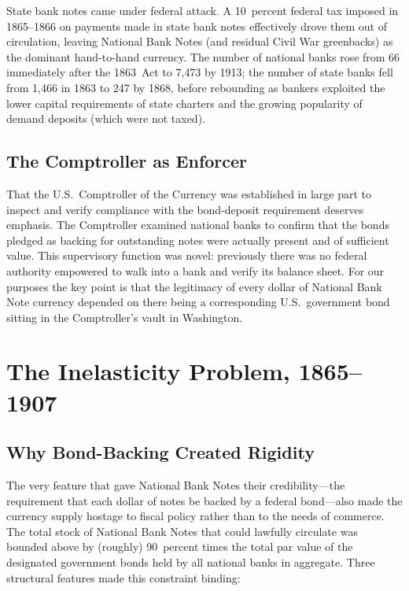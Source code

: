 \documentclass[12pt]{article}
\begin{document}
State bank notes came under federal attack.  A 10~percent federal tax
imposed in 1865--1866 on payments made in state bank notes effectively drove them
out of circulation, leaving National Bank Notes (and residual Civil War
greenbacks) as the dominant hand-to-hand currency.  The number of national banks
rose from 66 immediately after the 1863~Act to 7{,}473 by 1913; the number of state
banks fell from 1{,}466 in 1863 to 247 by 1868, before rebounding as bankers
exploited the lower capital requirements of state charters and the growing
popularity of demand deposits (which were not taxed).

\subsection{The Comptroller as Enforcer}

That the U.S.\ Comptroller of the Currency was established in large part to inspect
and verify compliance with the bond-deposit requirement deserves emphasis.  The
Comptroller examined national banks to confirm that the bonds pledged as backing for
outstanding notes were actually present and of sufficient value.  This supervisory
function was novel: previously there was no federal authority empowered to walk
into a bank and verify its balance sheet.  For our purposes the key point is that
the legitimacy of every dollar of National Bank Note currency depended on
there being a corresponding U.S.\ government bond sitting in the Comptroller's
vault in Washington.

\section{The Inelasticity Problem, 1865--1907}
\label{sec:inelasticity}

\subsection{Why Bond-Backing Created Rigidity}

The very feature that gave National Bank Notes their credibility---the requirement
that each dollar of notes be backed by a federal bond---also made the currency
supply hostage to fiscal policy rather than to the needs of commerce.  The total
stock of National Bank Notes that could lawfully circulate was bounded above by
(roughly) 90~percent times the total par value of the designated government bonds held
by all national banks in aggregate.  Three structural features made this constraint
binding:
\end{document}
